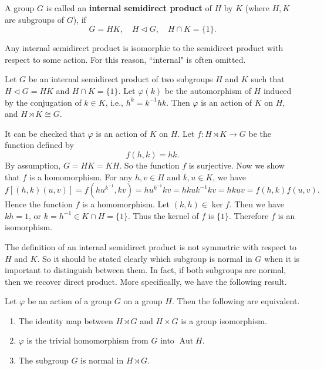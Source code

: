 \begin{definition}
	A group $G$ is called an \textbf{internal semidirect product} of $H$ by $K$ (where $H,K$ are subgroups of $G$), if
	$$G = HK,\quad H \lhd G, \quad H \cap K = \{1\}.$$
\end{definition}
Any internal semidirect product is 
isomorphic to the semidirect product with respect to some action. For this
reason, ``internal" is often omitted.
\begin{proposition} \label{prop-internal-semidirect-prod-isom}
	Let $G$ be an internal semidirect product of two subgroups $H$ and $K$ such that $H \lhd G = HK$ and $H \cap K = \{1\}$. Let $\varphi(k)$ be the automorphism of $H$ induced by the conjugation of $k \in K$, i.e., $h^k = k^{-1}hk$. Then $\varphi$ is an action of $K$ on $H$, and $H \rtimes K  \cong G$.
\end{proposition}
\begin{sketch}
	It can be checked that $\varphi$ is an action of $K$ on $H$. Let $f:H \rtimes K \to G$ be the function defined by
	$$f(h, k) = hk.$$
	By assumption, $G = HK = KH$. So the function $f$ is surjective. Now we show that $f$ is a homomorphism. For any $h, v \in H$ and $k, u \in K$, we have
	$$f[(h,k)(u, v)] = f(hu^{k^{-1}},kv) = hu^{k^{-1}}kv = hkuk^{-1}kv = hkuv = f(h,k)f(u,v).$$Hence the function $f$ is a homomorphism. Let $(k, h) \in\ker f$. Then we have $kh = 1$, or $k = h^{-1} \in K \cap H = \{1\}$. Thus the kernel of $f$ is $\{1\}$. Therefore $f$ is an isomorphism.
\end{sketch}
The definition of an internal semidirect product is not symmetric with respect to $H$ and $K$. So it should be stated clearly which subgroup is normal in $G$ when it is important to distinguish between them. In fact, if both subgroups are normal, then we recover  direct product. More specifically, we have the following result.
\begin{proposition} \label{prop-semidirect-trivial-hom}
	Let $\varphi$ be an action of a group $G$ on a group $H$. Then the following are equivalent.
	\begin{enumerate}[(1)]
		\item The identity  map between $H \rtimes G$ and $H \times G$ is a group isomorphism.
		\item $\varphi$ is the trivial homomorphism from $G$ into $\operatorname{Aut}H$.
		\item The subgroup $G$ is normal in $H \rtimes G$.
	\end{enumerate}
\end{proposition}
